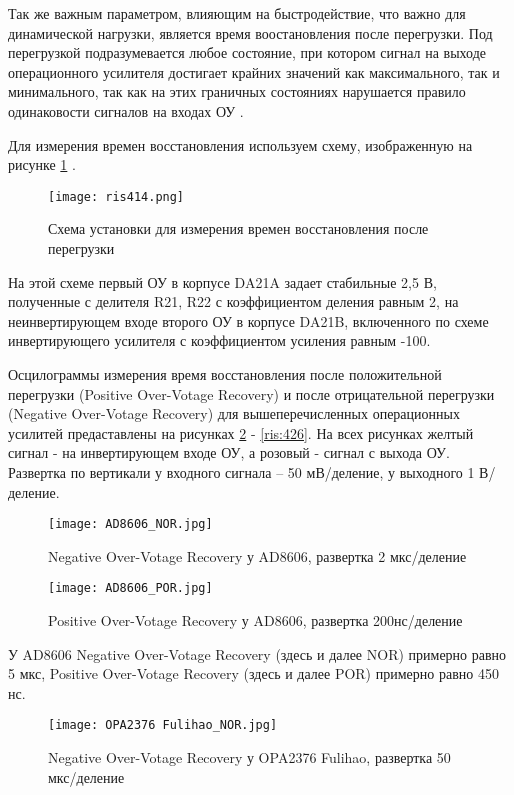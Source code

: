 Так же важным параметром, влияющим на быстродействие, что важно для динамической нагрузки, является 
время воостановления после перегрузки. Под перегрузкой подразумевается  любое состояние, при котором 
сигнал на выходе операционного усилителя достигает крайних значений как максимального, так и минимального,
так как на этих граничных состояниях нарушается правило одинаковости сигналов на входах ОУ \cite{Chopper:OU}.

Для измерения времен восстановления используем схему, изображенную на рисунке \ref{ris:414} \cite{GOST 23089.6-83}.

\begin{figure}[H]
\centering
\texttt{[image: ris414.png]}
\caption{Схема установки для измерения времен восстановления после перегрузки}
\label{ris:414}
\end{figure}

На этой схеме первый ОУ в корпусе DA21A задает стабильные 2,5 В, полученные с делителя R21, R22 с 
коэффициентом деления равным 2, на неинвертирующем входе второго ОУ в корпусе DA21B, включенного по схеме
инвертирующего усилителя с коэффициентом усиления равным -100. 


Осцилограммы измерения время восстановления после положительной перегрузки (Positive Over-Votage Recovery) 
и после отрицательной перегрузки (Negative Over-Votage Recovery) для вышеперечисленных операционных усилитей
предаставлены на рисунках \ref{ris:415} - \ref{ris:426}. На всех рисунках желтый сигнал - на инвертирующем 
входе ОУ, а розовый - сигнал с выхода ОУ. Развертка по вертикали у входного сигнала -- 50 мВ/деление, 
у выходного 1 В/деление. 

\begin{figure}[H]
\centering
\texttt{[image: AD8606\_NOR.jpg]}
\caption{Negative Over-Votage Recovery у AD8606, развертка 2 мкс/деление}
\label{ris:415}
\end{figure}

\begin{figure}[H]
\centering
\texttt{[image: AD8606\_POR.jpg]}
\caption{Positive Over-Votage Recovery у AD8606, развертка 200нс/деление}
\label{ris:416}
\end{figure}

У AD8606 Negative Over-Votage Recovery (здесь и далее NOR) примерно равно 5 мкс,
 Positive Over-Votage Recovery (здесь и далее POR) примерно равно 450 нс.

\begin{figure}[H]
\centering
\texttt{[image: OPA2376 Fulihao\_NOR.jpg]}
\caption{Negative Over-Votage Recovery у OPA2376 Fulihao, развертка 50 мкс/деление}
\label{ris:417}
\end{figure}

